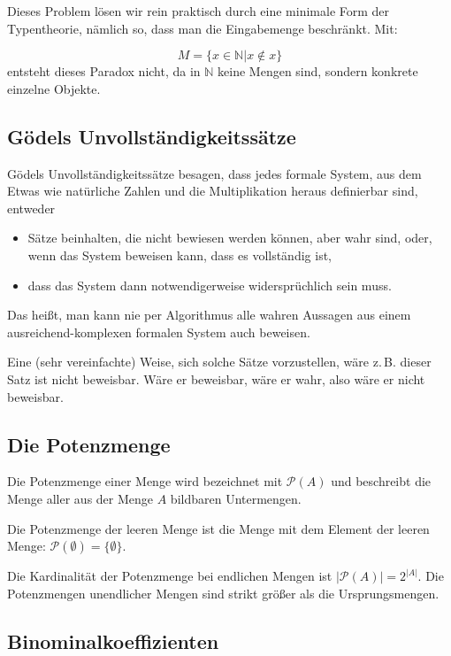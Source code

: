 \documentclass{scrartcl}
\begin{document}
Dieses Problem lösen wir rein praktisch durch eine minimale Form der Typentheorie, nämlich so,
dass man die Eingabemenge beschränkt. Mit:

\begin{equation}
	M = \{x \in \mathbb{N} | x \not\in x\}
\end{equation}
entsteht dieses Paradox nicht, da in $\mathbb{N}$ keine Mengen sind, sondern konkrete einzelne
Objekte.

\subsection{Gödels Unvollständigkeitssätze}

Gödels Unvollständigkeitssätze besagen, dass jedes formale System, aus dem Etwas wie natürliche Zahlen
und die Multiplikation heraus definierbar sind, entweder

\begin{itemize}
	\item Sätze beinhalten, die nicht bewiesen werden können, aber wahr sind, oder, wenn das System beweisen kann,
		dass es vollständig ist,
	\item dass das System dann notwendigerweise widersprüchlich sein muss.
\end{itemize}

Das heißt, man kann nie per Algorithmus alle wahren Aussagen aus einem ausreichend-komplexen formalen
System auch beweisen.

Eine (sehr vereinfachte) Weise, sich solche Sätze vorzustellen, wäre z.\,B. \frq dieser Satz ist nicht beweisbar\flq.
Wäre er beweisbar, wäre er wahr, also wäre er nicht beweisbar.

\subsection{Die Potenzmenge}

Die Potenzmenge einer Menge wird bezeichnet mit $\mathcal{P}(A)$ und beschreibt die Menge aller aus der Menge
$A$ bildbaren Untermengen.

Die Potenzmenge der leeren Menge ist die Menge mit dem Element der leeren Menge: $\mathcal{P}(\emptyset) = \{\emptyset\}$.

Die Kardinalität der Potenzmenge bei endlichen Mengen ist $|\mathcal{P}(A)| = 2^{|A|}$. Die Potenzmengen unendlicher
Mengen sind strikt größer als die Ursprungsmengen.

\subsection{Binominalkoeffizienten}
\end{document}
